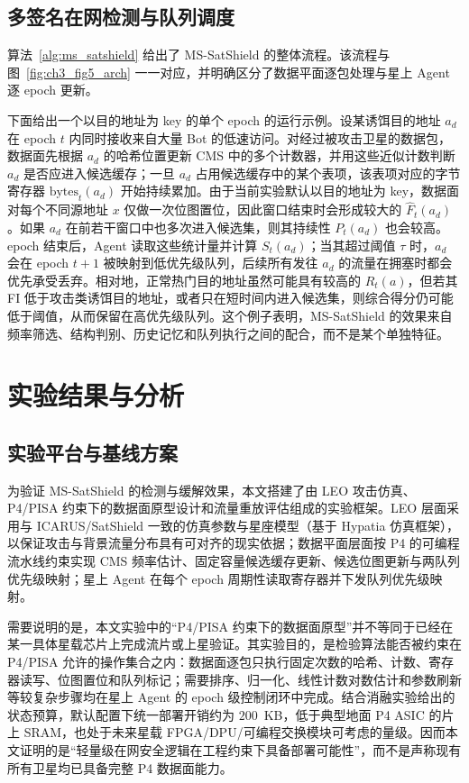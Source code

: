 \subsection{多签名在网检测与队列调度}
算法~\ref{alg:ms_satshield} 给出了 MS-SatShield 的整体流程。该流程与图~\ref{fig:ch3_fig5_arch} 一一对应，并明确区分了数据平面逐包处理与星上 Agent 逐 epoch 更新。

下面给出一个以目的地址为 key 的单个 epoch 的运行示例。设某诱饵目的地址 $a_d$ 在 epoch $t$ 内同时接收来自大量 Bot 的低速访问。对经过被攻击卫星的数据包，数据面先根据 $a_d$ 的哈希位置更新 CMS 中的多个计数器，并用这些近似计数判断 $a_d$ 是否应进入候选缓存；一旦 $a_d$ 占用候选缓存中的某个表项，该表项对应的字节寄存器 $\text{bytes}_t(a_d)$ 开始持续累加。由于当前实验默认以目的地址为 key，数据面对每个不同源地址 $x$ 仅做一次位图置位，因此窗口结束时会形成较大的 $\widehat{F}_t(a_d)$。如果 $a_d$ 在前若干窗口中也多次进入候选集，则其持续性 $P_t(a_d)$ 也会较高。epoch 结束后，Agent 读取这些统计量并计算 $S_t(a_d)$；当其超过阈值 $\tau$ 时，$a_d$ 会在 epoch $t+1$ 被映射到低优先级队列，后续所有发往 $a_d$ 的流量在拥塞时都会优先承受丢弃。相对地，正常热门目的地址虽然可能具有较高的 $R_t(a)$，但若其 FI 低于攻击类诱饵目的地址，或者只在短时间内进入候选集，则综合得分仍可能低于阈值，从而保留在高优先级队列。这个例子表明，MS-SatShield 的效果来自频率筛选、结构判别、历史记忆和队列执行之间的配合，而不是某个单独特征。

\section{实验结果与分析}
\subsection{实验平台与基线方案}
为验证 MS-SatShield 的检测与缓解效果，本文搭建了由 LEO 攻击仿真、P4/PISA 约束下的数据面原型设计和流量重放评估组成的实验框架。LEO 层面采用与 ICARUS/SatShield 一致的仿真参数与星座模型（基于 Hypatia 仿真框架），以保证攻击与背景流量分布具有可对齐的现实依据；数据平面层面按 P4 的可编程流水线约束实现 CMS 频率估计、固定容量候选缓存更新、候选位图更新与两队列优先级映射；星上 Agent 在每个 epoch 周期性读取寄存器并下发队列优先级映射。

需要说明的是，本文实验中的“P4/PISA 约束下的数据面原型”并不等同于已经在某一具体星载芯片上完成流片或上星验证。其实验目的，是检验算法能否被约束在 P4/PISA 允许的操作集合之内：数据面逐包只执行固定次数的哈希、计数、寄存器读写、位图置位和队列标记；需要排序、归一化、线性计数对数估计和参数刷新等较复杂步骤均在星上 Agent 的 epoch 级控制闭环中完成。结合消融实验给出的状态预算，默认配置下统一部署开销约为 $200$~KB，低于典型地面 P4 ASIC 的片上 SRAM，也处于未来星载 FPGA/DPU/可编程交换模块可考虑的量级。因而本文证明的是“轻量级在网安全逻辑在工程约束下具备部署可能性”，而不是声称现有所有卫星均已具备完整 P4 数据面能力。


